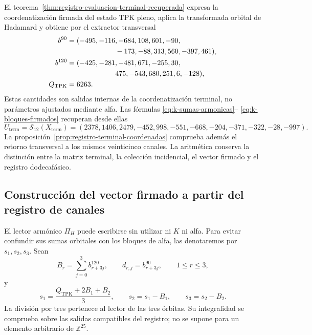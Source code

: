 

El teorema~\ref{thm:registro-evaluacion-terminal-recuperada} expresa la coordenatización
firmada del estado TPK pleno, aplica la transformada orbital de Hadamard y
obtiene por el extractor transversal
\begin{align*}
 b^{90}={}&(-495,-116,-684,108,601,-90,\\
            &\hspace{19mm}-173,-88,313,560,-397,461),\\
 b^{120}={}&(-425,-281,-481,671,-255,30,\\
             &\hspace{19mm}475,-543,680,251,6,-128),\\
 Q_{\mathrm{TPK}}={}&6263.
\end{align*}
Estas cantidades son salidas internas de la coordenatización terminal, no parámetros
ajustados mediante alfa. Las fórmulas \eqref{eq:k-sumas-armonicas}--
\eqref{eq:k-bloques-firmados} recuperan desde ellas
\begin{equation}
 U_{\mathrm{term}}
 =\mathcal S_{12}(X_{\mathrm{term}})
 =(2378,1406,2479,-452,998,-551,
   -668,-204,-371,-322,-28,-997).
 \label{eq:k-u-terminal-directo}
\end{equation}
La proposición~\ref{prop:registro-terminal-coordenadas} comprueba además el
retorno transversal a los mismos veinticinco canales. La aritmética conserva
la distinción entre la matriz terminal, la colección incidencial, el vector
firmado y el registro dodecafásico.

\subsection{Construcción del vector firmado a partir del registro de canales}
\label{subsec:k-pi-h}

El lector armónico \(\Pi_H\) puede escribirse sin utilizar ni \(K\) ni
alfa. Para evitar confundir sus sumas orbitales con los bloques de alfa,
las denotaremos por \(s_1,s_2,s_3\). Sean
\[
 B_r=\sum_{j=0}^{3}b^{120}_{r+3j},\qquad
 d_{r,j}=b^{90}_{r+3j},\qquad1\leq r\leq3,
\]
y
\begin{equation}
 s_1=\frac{Q_{\mathrm{TPK}}+2B_1+B_2}{3},\qquad
 s_2=s_1-B_1,\qquad s_3=s_2-B_2.
 \label{eq:k-sumas-armonicas}
\end{equation}
La división por tres pertenece al lector de las tres órbitas. Su
integralidad se comprueba sobre las salidas compatibles del registro; no
se supone para un elemento arbitrario de \(\mathbb Z^{25}\).

